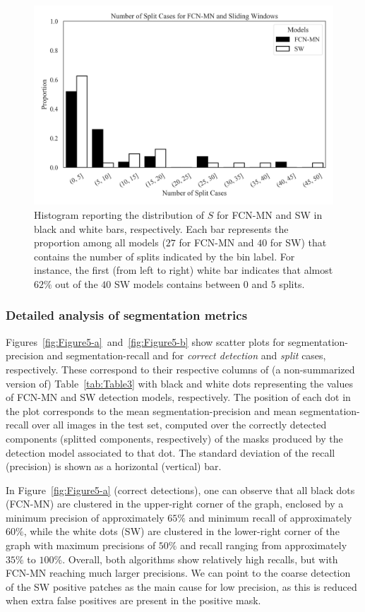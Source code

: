 \documentclass[a4paper,authoryear,review]{elsarticle}
\begin{document}
\begin{figure}
    \centering
    \includegraphics[width=\textwidth]{figures/Figure4.png}
    \caption{
Histogram reporting the distribution of $S$ for FCN-MN and SW in black and white bars, respectively. Each bar represents the proportion among all models ($27$ for FCN-MN  and $40$ for SW) that contains the number of splits indicated by the bin label. For instance, the first (from left to right) white bar indicates that almost $62\%$ out of the $40$ SW models contains between $0$ and $5$ splits.
    }
    \label{fig:Figure4}
\end{figure}


\subsubsection{Detailed analysis of segmentation metrics}

Figures~\ref{fig:Figure5-a}~and~\ref{fig:Figure5-b} show scatter plots for segmentation-precision and segmentation-recall and for \emph{correct detection} and \emph{split} cases, respectively. These correspond to their respective columns of (a non-summarized version of) Table~\ref{tab:Table3} with black and white dots representing the values of FCN-MN and SW detection models, respectively. The position of each dot in the plot corresponds to the mean segmentation-precision and mean segmentation-recall over all images in the test set, computed over the correctly detected components (splitted components, respectively) of the masks produced by the detection model associated to that dot. The standard deviation of the recall (precision) is shown as a horizontal (vertical) bar.

In Figure~\ref{fig:Figure5-a} (correct detections), one can observe that all black dots (FCN-MN) are clustered in the upper-right corner of the graph, enclosed by a minimum precision of approximately $65\%$ and minimum recall of approximately $60\%$, while the white dots (SW) are clustered in the lower-right corner of the graph with maximum precisions of $50\%$ and recall ranging from approximately $35\%$ to $100\%$. Overall, both algorithms show relatively high recalls, but with FCN-MN reaching much larger precisions. We can point to the coarse detection of the SW positive patches as the main cause for low precision, as this is reduced when extra false positives are present in the positive mask. 
\end{document}
